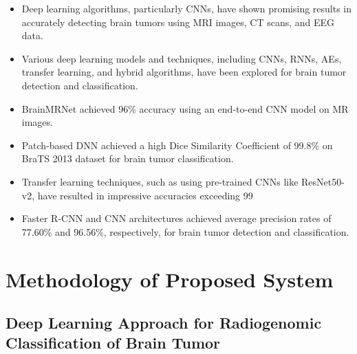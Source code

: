 \documentclass[a4paper,12pt]{extarticle}
\begin{document}
\begin{itemize}
    \item Deep learning algorithms, particularly CNNs, have shown promising results in accurately detecting brain tumors using MRI images, CT scans, and EEG data.
    \item Various deep learning models and techniques, including CNNs, RNNs, AEs, transfer learning, and hybrid algorithms, have been explored for brain tumor detection and classification.
    \item BrainMRNet achieved 96\% accuracy using an end-to-end CNN model on MR images.
    \item Patch-based DNN achieved a high Dice Similarity Coefficient of 99.8\% on BraTS 2013 dataset for brain tumor classification.
    \item Transfer learning techniques, such as using pre-trained CNNs like ResNet50-v2, have resulted in impressive accuracies exceeding 99%
    \item Faster R-CNN and CNN architectures achieved average precision rates of 77.60\% and 96.56\%, respectively, for brain tumor detection and classification.
\end{itemize}

        

\section{Methodology of Proposed System}
\subsection{Deep Learning Approach for Radiogenomic Classification of Brain Tumor}
\end{document}
